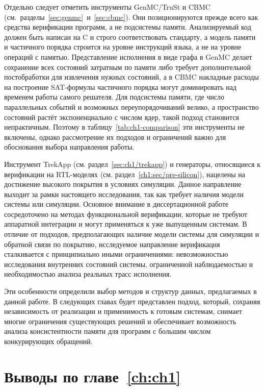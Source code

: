 Отдельно следует отметить инструменты GenMC/TruSt и CBMC
(см.~разделы~\ref{sec:genmc}~и~\ref{sec:cbmc}). Они позиционируются
прежде всего как средства верификации программ, а не подсистемы
памяти. Анализируемый код должен быть написан на C и строго соответствовать
стандарту, а модель памяти и частичного порядка строится на уровне
инструкций языка, а не на уровне операций с памятью.
Представление исполнения в виде графа в GenMC делает сохранение
всех состояний затратным по памяти либо требует дополнительной
постобработки для извлечения нужных состояний, а в CBMC накладные
расходы на построение SAT-формулы частичного порядка могут
доминировать над временем работы самого решателя.
Для подсистемы памяти, где число параллельных событий и возможных
переупорядочиваний велико, а пространство состояний растёт
экспоненциально с числом ядер, такой подход становится непрактичным.
Поэтому в таблицу~\ref{tab:ch1-comparison} эти инструменты не
включены, однако рассмотрение их подходов и ограничений важно
для обоснования выбора направления работы.

Инструмент TrekApp (см. раздел~\ref{sec:ch1/trekapp}) и генераторы,
относящиеся к верификации на RTL-моделях (см.
раздел~\ref{ch1:sec/pre-silicon}), нацелены на достижение высокого
покрытия в условиях симуляции. Данное направление выходит за рамки
настоящего исследования, так как требует наличия модели системы или
симуляции. Основное внимание в диссертационной работе
сосредоточено на методах функциональной верификации, которые не требуют
аппаратной интеграции и могут применяться к уже выпущенным системам.
В отличие от подходов, предполагающих наличие модели
системы для симуляции и обратной связи по покрытию, исследуемое направление
верификация сталкивается с принципиально иными ограничениями:
невозможностью исследования внутренних состояний системы,
ограниченной наблюдаемостью и необходимостью анализа реальных трасс исполнения.

Эти особенности определили выбор методов и структур данных,
предлагаемых в данной работе. В следующих главах будет представлен
подход, который, сохраняя независимость от реализации и применимость
к готовым системам,
снимает многие ограничения существующих решений и обеспечивает
возможность анализа консистентности памяти для программ с большим
числом конкурирующих обращений.

\section{Выводы по главе~\ref{ch:ch1}}

